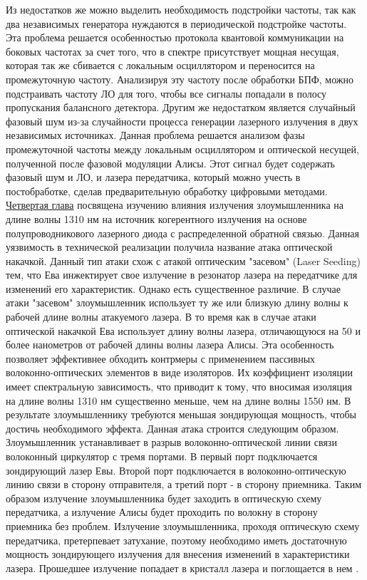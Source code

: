 \newline Из недостатков же можно выделить необходимость подстройки частоты, так как два независимых генератора нуждаются в периодической подстройке частоты. Эта проблема решается особенностью протокола квантовой коммуникации на боковых частотах за счет того, что в спектре присутствует мощная несущая, которая так же сбивается с локальным осциллятором и переносится на промежуточную частоту. Анализируя эту частоту после обработки БПФ, можно подстраивать частоту ЛО для того, чтобы все сигналы попадали в полосу пропускания балансного детектора. Другим же недостатком является случайный фазовый шум из-за случайности процесса генерации лазерного излучения в двух независимых источниках. Данная проблема решается анализом фазы промежуточной частоты между локальным осциллятором и оптической несущей, полученной после фазовой модуляции Алисы. Этот сигнал будет содержать фазовый шум и ЛО, и лазера передатчика, который можно учесть в постобработке, сделав предварительную обработку цифровыми методами. 
\newpage \underline{Четвертая глава} посвящена изучению влияния излучения злоумышленника на длине волны 1310 нм на источник когерентного излучения на основе полупроводникового лазерного диода с распределенной обратной связью. Данная уязвимость в технической реализации получила название атака оптической накачкой\cite{fadeev2024b,fadeev2025}. Данный тип атаки схож с атакой оптическим "засевом" (Laser Seeding) \cite{huang2019,lovic2023} тем, что Ева инжектирует свое излучение в резонатор лазера на передатчике для изменений его характеристик. Однако есть существенное различие. В случае атаки "засевом" злоумышленник использует ту же или близкую длину волны к рабочей длине волны атакуемого лазера. В то время как в случае атаки оптической накачкой Ева использует длину волны лазера, отличающуюся на 50 и более нанометров от рабочей длины волны лазера Алисы. Эта особенность позволяет эффективнее обходить контрмеры с применением пассивных волоконно-оптических элементов в виде изоляторов\cite{borisova2020,nasedkin2022,nasedkin2023}. Их коэффициент изоляции имеет спектральную зависимость, что приводит к тому, что вносимая изоляция на длине волны 1310 нм существенно меньше, чем на длине волны 1550 нм. В результате злоумышленнику требуются меньшая зондирующая мощность, чтобы достичь необходимого эффекта. 
\newline Данная атака строится следующим образом. Злоумышленник устанавливает в разрыв волоконно-оптической линии связи волоконный циркулятор с тремя портами. В первый порт подключается зондирующий лазер Евы. Второй порт подключается в волоконно-оптическую линию связи в сторону отправителя, а третий порт - в сторону приемника. Таким образом излучение злоумышленника будет заходить в оптическую схему передатчика, а излучение Алисы будет проходить по волокну в сторону приемника без проблем. Излучение злоумышленника, проходя оптическую схему передатчика, претерпевает затухание, поэтому необходимо иметь достаточную мощность зондирующего излучения для внесения изменений в характеристики лазера. Прошедшее излучение попадает в кристалл лазера и поглощается в нем \cite{hui2023}.
